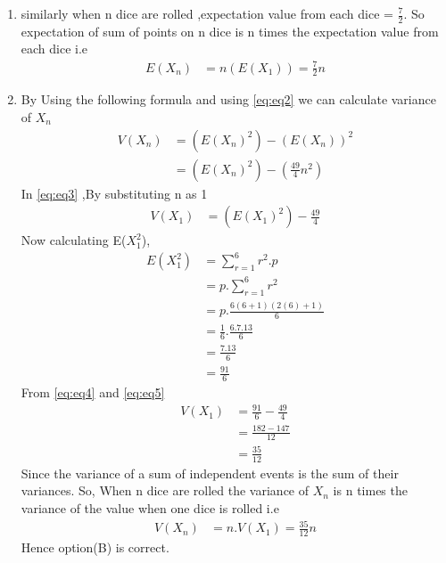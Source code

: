 \documentclass[journal,12pt,twocolumn]{IEEEtran}
\begin{document}
\begin{enumerate}
\item similarly when n dice are rolled ,expectation value from each dice 
= $\frac{7}{2} $. 
So expectation of sum of points on n dice is n times the expectation value from each dice i.e
\begin{align}
    E(X_{n})& = n(E(X_{1})) =\frac{7}{2} n 
\label{eq:eq2}
\end{align}
\item By Using the following formula and using \eqref{eq:eq2}  we can calculate variance of  $X_{n}$ 
    \begin{align}
    V(X_{n})&=(E(X_{n})^{2}) - (E(X_{n}))^{2}
    \\
    &=(E(X_{n})^{2}) - (\frac{49}{4}n^{2})
    \label{eq:eq3}
    \end{align}
    In \eqref{eq:eq3} ,By substituting n as 1 
    \begin{align}
        V(X_{1})&=(E(X_{1})^{2}) - \frac{49}{4}
        \label{eq:eq4}
    \end{align}
    Now calculating E($X_{1}^{2}$),
    \begin{align}
      E(X_{1}^{2})&=\sum_{r=1}^6r^{2}.p
      \\
      &=p.\sum_{r=1}^6r^{2}
      \\
      &=p.\frac{6(6+1)(2(6)+1)}{6}
      \\
      &=\frac{1}{6}.\frac{6.7.13}{6}
      \\
      &=\frac{7.13}{6}
      \\
      &=\frac{91}{6}
      \label{eq:eq5}
    \end{align}
    From \eqref{eq:eq4} and \eqref{eq:eq5}
    \begin{align}
        V(X_{1})&=\frac{91}{6} -\frac{49}{4}
        \\
        &=\frac{182-147}{12}
        \\
        &=\frac{35}{12}
        \label{eq:eq6}
    \end{align}
    Since the variance of a sum of independent events is the sum of their variances. So, When n dice are rolled the variance of $X_{n}$ is n times the variance of the value when one dice is rolled i.e
    \begin{align}
        V(X_{n})&=n.V(X_{1}) = \frac{35}{12}n
    \end{align}
    Hence option(B) is correct.
\end{enumerate}
\end{document}
